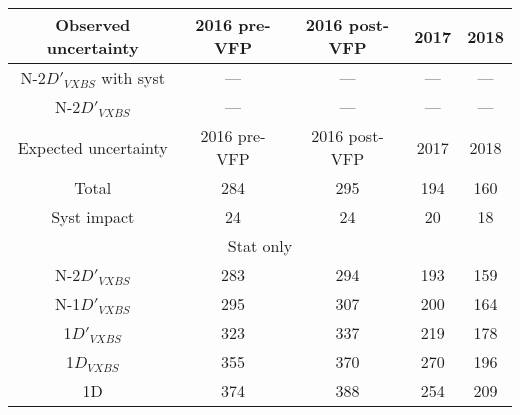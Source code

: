 \begin{table}[ht]
\begin{center}
\begin{tabular}{ccccccc}
    \hline			
    \end{tabular}
    \label{table:2D_refit_result_finals}
\end{center}
\end{table}

\begin{table}[ht]	
\begin{center}
    \begin{tabular}{ccccc}
    \hline		
    Observed uncertainty	&	2016 pre-VFP	&	2016 post-VFP	&	2017	&	2018	\\
    \hline			
    N-2$D'_{VXBS}$ with syst	&	---	&	---	&	---	&	---\\
    N-2$D'_{VXBS}$	&	---	&	---	&	---	&	---\\
    \hline			
    \hline			
    Expected uncertainty	&	2016 pre-VFP	&	2016 post-VFP	&	2017	&	2018	\\
    \hline			
    Total	&	284	&	295	&	194	&	160	\\
    \hline			
    Syst impact	&	24	&	24	&	20	&	18	\\
    \hline
    \multicolumn{5}{c}{Stat only}\\
    \hline
    N-2$D'_{VXBS}$	&	283	&	294	&	193	&	159	\\
    N-1$D'_{VXBS}$	&	295	&	307	&	200	&	164	\\
    1$D'_{VXBS}$	&	323	&	337	&	219	&	178	\\
    1$D_{VXBS}$		&	355	&	370	&	270	&	196	\\
    1D				&	374	&	388	&	254	&	209	\\
    \hline			
    \end{tabular}
    \label{table:2D_refit_result_finals_year}
\end{center}
\end{table}
